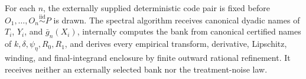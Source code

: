 For each \(n\), the externally supplied deterministic code pair is fixed before \(O_1,\ldots,O_n\stackrel{\mathrm{iid}}{\sim}P\) is drawn.  The spectral algorithm receives canonical dyadic names of \(T_i\), \(Y_i\), and \(\bar g_n(X_i)\), internally computes the bank from canonical certified names of \(k,\delta,\psi_{\eta},R_0,R_1\), and derives every empirical transform, derivative, Lipschitz, winding, and final-integrand enclosure by finite outward rational refinement.  It receives neither an externally selected bank nor the treatment-noise law.